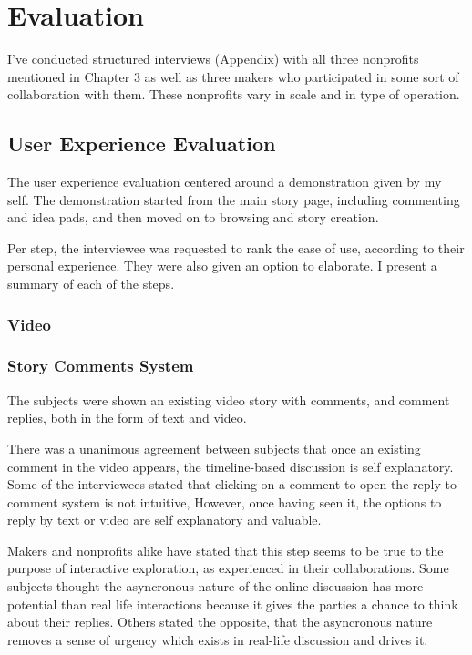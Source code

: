 \chapter{Evaluation}
\label{chap_eval}

I've conducted structured interviews (Appendix) with all three nonprofits mentioned in Chapter 3 as well as three makers who participated in some sort of collaboration with them. These nonprofits vary in scale and in type of operation.

\section{User Experience Evaluation}

The user experience evaluation centered around a demonstration given by my self. The demonstration started from the main story page, including commenting and idea pads, and then moved on to browsing and story creation. 


Per step, the interviewee was requested to rank the ease of use, according to their personal experience. They were also given an option to elaborate. I present a summary of each of the steps.

\subsection{Video}

\subsection{Story Comments System}

The subjects were shown an existing video story with comments, and comment replies, both in the form of text and video.

There was a unanimous agreement between subjects that once an existing comment in the video appears, the timeline-based discussion is self explanatory. Some of the interviewees stated that clicking on a comment to open the reply-to-comment system is not intuitive, However, once having seen it, the options to reply by text or video are self explanatory and valuable.

Makers and nonprofits alike have stated that this step seems to be true to the purpose of interactive exploration, as experienced in their collaborations. Some subjects thought the asyncronous nature of the online discussion has more potential than real life interactions because it gives the parties a chance to think about their replies. Others stated the opposite, that the asyncronous nature removes a sense of urgency which exists in real-life discussion and drives it. 

